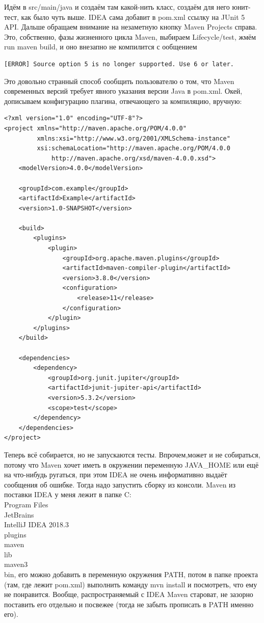 \documentclass[a5paper]{article}
\begin{document}
Идём в src/main/java и создаём там какой-нить класс, создаём для него юнит-тест, как было чуть выше. IDEA сама добавит в pom.xml ссылку на JUnit 5 API. Дальше обращаем внимание на незаметную кнопку Maven Projects справа. Это, собственно, фазы жизненного цикла Maven, выбираем Lifecycle/test, жмём run maven build, и оно внезапно не компилится с ообщением

\begin{verbatim}
[ERROR] Source option 5 is no longer supported. Use 6 or later.
\end{verbatim}

Это довольно странный способ сообщить пользователю о том, что Maven современных версий требует явного указания версии Java в pom.xml. Окей, дописываем конфигурацию плагина, отвечающего за компиляцию, вручную:

\begin{verbatim}
<?xml version="1.0" encoding="UTF-8"?>
<project xmlns="http://maven.apache.org/POM/4.0.0"
         xmlns:xsi="http://www.w3.org/2001/XMLSchema-instance"
         xsi:schemaLocation="http://maven.apache.org/POM/4.0.0
             http://maven.apache.org/xsd/maven-4.0.0.xsd">
    <modelVersion>4.0.0</modelVersion>

    <groupId>com.example</groupId>
    <artifactId>Example</artifactId>
    <version>1.0-SNAPSHOT</version>

    <build>
        <plugins>
            <plugin>
                <groupId>org.apache.maven.plugins</groupId>
                <artifactId>maven-compiler-plugin</artifactId>
                <version>3.8.0</version>
                <configuration>
                    <release>11</release>
                </configuration>
            </plugin>
        </plugins>
    </build>

    <dependencies>
        <dependency>
            <groupId>org.junit.jupiter</groupId>
            <artifactId>junit-jupiter-api</artifactId>
            <version>5.3.2</version>
            <scope>test</scope>
        </dependency>
    </dependencies>
</project>
\end{verbatim}

Теперь всё собирается, но не запускаются тесты. Впрочем,может и не собираться, потому что Maven хочет иметь в окружении переменную JAVA\_HOME или ещё на что-нибудь ругаться, при этом IDEA не очень информативно выдаёт сообщения об ошибке. Тогда надо запустить сборку из консоли. Maven из поставки IDEA у меня лежит в папке C:\\Program Files\\JetBrains\\IntelliJ IDEA 2018.3\\plugins\\maven\\lib\\maven3\\bin, его можно добавить в переменную окружения PATH, потом в папке проекта (там, где лежит pom.xml) выполнить команду mvn install и посмотреть, что ему не понравится. Вообще, распространяемый с IDEA Maven староват, не зазорно поставить его отдельно и посвежее (тогда не забыть прописать в PATH именно его).
\end{document}
